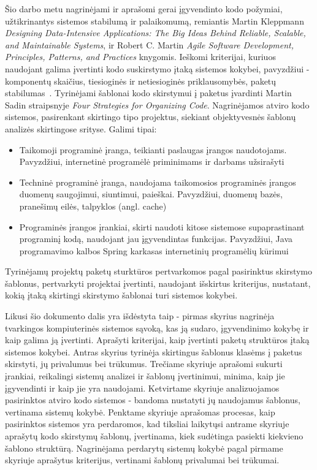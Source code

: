 Šio darbo metu nagrinėjami ir aprašomi gerai įgyvendinto kodo požymiai, užtikrinantys
sistemos stabilumą ir palaikomumą, remiantis Martin Kleppmann \textit{Designing Data-Intensive Applications: The Big Ideas Behind Reliable, Scalable, and Maintainable Systems},
ir Robert C. Martin \textit{Agile Software Development, Principles, Patterns, and Practices} knygomis.
Ieškomi kriterijai, kuriuos naudojant galima įvertinti kodo suskirstymo įtaką sistemos kokybei, pavyzdžiui - komponentų skaičius,
tiesioginės ir netiesioginės priklausomybės, paketų stabilumas~\cite{AgileSoftwareDevelopment}.
Tyrinėjami šablonai kodo skirstymui į paketus įvardinti Martin Sadin straipsnyje \textit{Four Strategies for Organizing Code}.
Nagrinėjamos atviro kodo sistemos, pasirenkant skirtingo tipo projektus, siekiant
objektyvesnės šablonų analizės skirtingose srityse.
Galimi tipai:
    \begin{itemize}
        \item Taikomoji programinė įranga, teikianti paslaugas įrangos naudotojams. Pavyzdžiui,
internetinė programėlė priminimams ir darbams užsirašyti
        \item Techninė programinė įranga, naudojama taikomosios programinės įrangos duomenų
saugojimui, siuntimui, paieškai. Pavyzdžiui, duomenų bazės, pranešimų eilės, talpyklos
(angl. cache)
        \item Programinės įrangos įrankiai, skirti naudoti kitose sistemose supaprastinant programinį
kodą, naudojant jau įgyvendintas funkcijas. Pavyzdžiui, Java programavimo kalbos
Spring karkasas internetinių programėlių kūrimui
    \end{itemize}
Tyrinėjamų projektų paketų sturktūros pertvarkomos pagal pasirinktus skirstymo šablonus, pertvarkyti projektai įvertinti, naudojant išskirtus kriterijus, nustatant, kokią įtaką
skirtingi skirstymo šablonai turi sistemos kokybei.

Likusi šio dokumento dalis yra išdėstyta taip - pirmas skyrius nagrinėja tvarkingos kompiuterinės sistemos sąvoką, kas ją sudaro, įgyvendinimo kokybę ir kaip galima ją įvertinti.
Aprašyti kriterijai, kaip įvertinti paketų struktūros įtaką sistemos kokybei.
Antras skyrius tyrinėja skirtingus šablonus klasėms į paketus skirstyti, jų privalumus bei trūkumus.
Trečiame skyriuje aprašomi sukurti įrankiai, reikalingi sistemų analizei ir šablonų įvertinimui, minima, kaip jie įgyvendinti ir kaip jie yra naudojami.
Ketvirtame skyriuje analizuojamos pasirinktos atviro kodo sistemos - bandoma nustatyti jų naudojamus šablonus, vertinama sistemų kokybė.
Penktame skyriuje aprašomas procesas, kaip pasirinktos sistemos yra perdaromos, kad tiksliai laikytųsi antrame skyriuje aprašytų kodo skirstymų šablonų, įvertinama, kiek sudėtinga pasiekti kiekvieno šablono struktūrą.
Nagrinėjama perdarytų sistemų kokybė pagal pirmame skyriuje aprašytus kriterijus, vertinami šablonų privalumai bei trūkumai.
